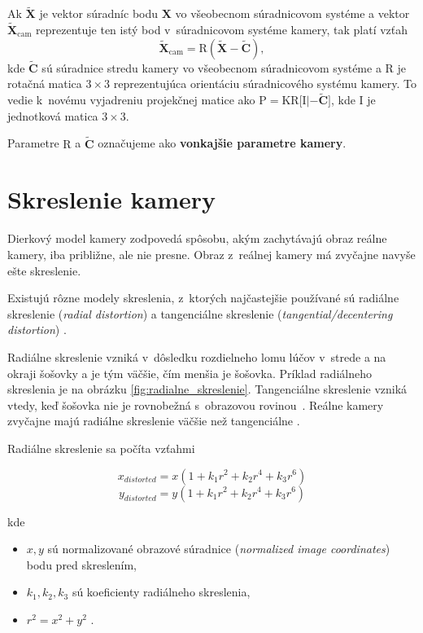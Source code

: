 Ak $\widetilde{\mathbf{X}}$ je vektor súradníc bodu $\mathbf{X}$ vo všeobecnom súradnicovom systéme a vektor $\widetilde{\mathbf{X}}_{\mathrm{cam}}$ reprezentuje ten istý bod v~súradnicovom systéme kamery, tak platí vzťah 
$$\widetilde{\mathbf{X}}_{\mathrm{cam}} = \mathrm{R} (\widetilde{\mathbf{X}} - \widetilde{\mathbf{C}}),$$ 
kde $\widetilde{\mathbf{C}}$ sú súradnice stredu kamery vo všeobecnom súradnicovom systéme a $\mathrm{R}$ je rotačná matica $3 \times 3$ reprezentujúca orientáciu súradnicového systému kamery. To vedie k~novému vyjadreniu projekčnej matice ako $\mathrm{P} = \mathrm{K} \mathrm{R} \bigl[ \mathrm{I} | - \widetilde{\mathbf{C}} \bigr]$, kde $\mathrm{I}$ je jednotková matica $3 \times 3$.

Parametre $\mathrm{R}$ a $\widetilde{\mathbf{C}}$ označujeme ako \textbf{vonkajšie parametre kamery}.

\section{Skreslenie kamery}
\label{sec:skreslenie}

Dierkový model kamery zodpovedá spôsobu, akým zachytávajú obraz reálne kamery, iba približne, ale nie presne. Obraz z~reálnej kamery má zvyčajne navyše ešte skreslenie.

Existujú rôzne modely skreslenia, z~ktorých najčastejšie používané sú radiálne skreslenie (\emph{radial distortion}) a tangenciálne skreslenie (\emph{tangential/decentering distortion}) \cite{sun_cooperstock_camera_calibration}.

Radiálne skreslenie vzniká v~dôsledku rozdielneho lomu lúčov v~strede a na okraji šošovky a je tým väčšie, čím menšia je šošovka. Príklad radiálneho skreslenia je na obrázku \ref{fig:radialne_skreslenie}. Tangenciálne skreslenie vzniká vtedy, keď šošovka nie je rovnobežná s~obrazovou rovinou~\cite{matlab_camera_calibration}. Reálne kamery zvyčajne majú radiálne skreslenie väčšie než tangenciálne \cite{opencv_camera_calibration_older}.

Radiálne skreslenie sa počíta vzťahmi

$$x_{distorted} = x(1 + k_1 r^2 + k_2 r^4 + k_3 r^6)$$
$$y_{distorted} = y(1 + k_1 r^2 + k_2 r^4 + k_3 r^6)$$

kde

\begin{itemize}
    \item $x, y$ sú normalizované obrazové súradnice (\emph{normalized image coordinates}) bodu pred skreslením,
    \item $k_1, k_2, k_3$ sú koeficienty radiálneho skreslenia,
    \item $r^2 = x^2 + y^2$ \cite{opencv_camera_calibration}.
\end{itemize}

